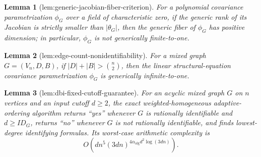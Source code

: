 \documentclass{article}
\newtheorem{lemma}{Lemma}
\begin{document}
\begin{lemma}[lem:generic-jacobian-fiber-criterion]\label{lem:generic-jacobian-fiber-criterion}
For a polynomial covariance parametrization \(\phi_G\) over a field of characteristic zero, if the generic rank of its Jacobian is strictly smaller than \(|\theta_G|\), then the generic fiber of \(\phi_G\) has positive dimension; in particular, \(\phi_G\) is not generically finite-to-one.
\end{lemma}

\begin{lemma}[lem:edge-count-nonidentifiability]\label{lem:edge-count-nonidentifiability}
For a mixed graph \(G=(V_n,D,B)\), if \(|D|+|B|>\binom n2\), then the linear structural-equation covariance parametrization \(\phi_G\) is generically infinite-to-one.
\end{lemma}

\begin{lemma}[lem:dbi-fixed-cutoff-guarantee]\label{lem:dbi-fixed-cutoff-guarantee}
For an acyclic mixed graph \(G\) on \(n\) vertices and an input cutoff \(d\geq2\), the exact weighted-homogeneous adaptive-ordering algorithm returns ``yes'' whenever \(G\) is rationally identifiable and \(d\geq ID_G\), returns ``no'' whenever \(G\) is not rationally identifiable, and finds lowest-degree identifying formulas.  Its worst-case arithmetic complexity is
\[
 O\!\left(dn^5(3dn)^{4\alpha_{\mathrm{alg}}d^2\log(3dn)}\right).
\]
\end{lemma}
\end{document}
